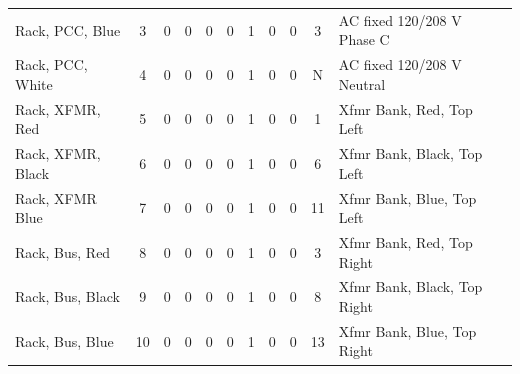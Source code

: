 \begin{table}[!htp]
{\begin{tabular}{lcccccccccll}
			Rack, PCC, Blue                & 3                       & 0                                           & 0                                          & 0           & 0           & 1            & 0                & 0 & 3                            & AC fixed 120/208 V Phase C       &                \\
			Rack, PCC, White               & 4                       & 0                                           & 0                                          & 0           & 0           & 1            & 0                & 0 & N                            & AC fixed 120/208 V Neutral       &                \\
			Rack, XFMR, Red                & 5                       & 0                                           & 0                                          & 0           & 0           & 1            & 0                & 0 & 1                            & Xfmr Bank, Red, Top Left         &                \\
			Rack, XFMR, Black              & 6                       & 0                                           & 0                                          & 0           & 0           & 1            & 0                & 0 & 6                            & Xfmr Bank, Black, Top Left       &                \\
			Rack, XFMR Blue                & 7                       & 0                                           & 0                                          & 0           & 0           & 1            & 0                & 0 & 11                           & Xfmr Bank, Blue, Top Left        &                \\
			Rack, Bus, Red                 & 8                       & 0                                           & 0                                          & 0           & 0           & 1            & 0                & 0 & 3                            & Xfmr Bank, Red, Top Right        &                \\
			Rack, Bus, Black               & 9                       & 0                                           & 0                                          & 0           & 0           & 1            & 0                & 0 & 8                            & Xfmr Bank, Black, Top Right      &                \\
			Rack, Bus, Blue                & 10                      & 0                                           & 0                                          & 0           & 0           & 1            & 0                & 0 & 13                           & Xfmr Bank, Blue, Top Right       &                \\

\end{tabular}}
\end{table}
